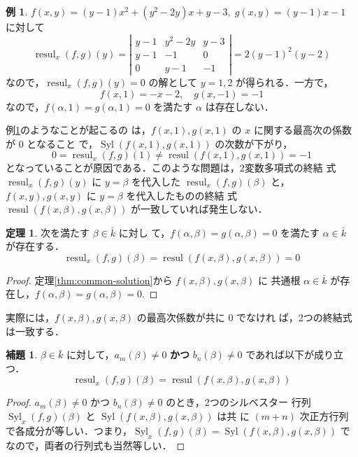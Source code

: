 \documentclass[12pt, uplatex, dvipdfmx]{jsarticle}
\theoremstyle{definition}
\newtheorem{theorem}{定理}
\newtheorem{lemma}{補題}
\newtheorem{example}{例}
\DeclareMathOperator{\Syl}{Syl}
\DeclareMathOperator{\resul}{resul}
\begin{document}
\begin{example}\label{exmp:degenerate}
  $f(x,y)=(y-1)x^2 + (y^2-2y)x + y-3, \; g(x,y) = (y-1)x-1$ に対して
  \[
    \resul_x(f,g)(y) = \left|
      \begin{array}{ccc}
        y-1 & y^2-2y & y-3\\
        y-1 & -1 & 0\\
        0 & y-1 & -1
      \end{array}
    \right| = 2(y-1)^2(y-2)
  \]
  なので，$\resul_x(f,g)(y)=0$ の解として $y=1,2$ が得られる．一方で，
  \[
    f(x,1) = -x-2, \quad g(x,-1)=-1
  \]
  なので，$f(\alpha,1)=g(\alpha,1)=0$ を満たす $\alpha$ は存在しない．
\end{example}

例\ref{exmp:degenerate}のようなことが起こるの
は，$f(x,1),g(x,1)$ の $x$ に関する最高次の係数が $0$ となること
で，$\Syl(f(x,1), g(x,1))$ の次数が下がり，
  \[
    0=\resul_x(f,g)(1) \neq \resul(f(x,1), g(x,1))=-1
  \]
  となっていることが原因である．このような問題は，2変数多項式の終結
  式 $\resul_x(f,g)(y)$ に $y=\beta$ を代入した $\resul_x(f,g)(\beta)$
  と，$f(x,y), g(x,y)$ に $y=\beta$ を代入したものの終結
  式 $\resul(f(x,\beta), g(x,\beta))$ が一致していれば発生しない．

  \begin{theorem}\label{thm:2resul}
    次を満たす $\beta \in \bar{k}$ に対し
    て，$f(\alpha,\beta)=g(\alpha,\beta)=0$ を満たす $\alpha \in
    \bar{k}$ が存在する．
    \[
      \resul_x(f,g)(\beta) = \resul(f(x,\beta), g(x,\beta)) =0
    \]
  \end{theorem}

  \begin{proof}
    定理\ref{thm:common-solution}から $f(x,\beta), g(x,\beta)$ に
    共通根 $\alpha \in \bar{k}$ が存在し，$f(\alpha,\beta)=g(\alpha,\beta)=0$. 
  \end{proof}

  実際には，$f(x,\beta), g(x,\beta)$ の最高次係数が共に $0$ でなけれ
  ば，2つの終結式は一致する．
  
\begin{lemma}\label{lem:equal-resul}
  $\beta \in \bar{k}$ に対して，$a_m(\beta) \neq 0$ \textbf{かつ} $b_n(\beta) \neq 0$ であれば以下が成り立つ．
  \[
    \resul_x(f,g)(\beta) = \resul(f(x,\beta), g(x,\beta))
  \]
\end{lemma}

\begin{proof}
  $a_m(\beta) \neq 0$ かつ $b_n(\beta)\neq 0$ のとき，2つのシルベスター
  行列 $\Syl_x(f,g)(\beta)$ と $\Syl(f(x,\beta), g(x,\beta))$ は共
  に $(m+n)$
  次正方行列で各成分が等しい．つまり，$\Syl_x(f,g)(\beta) =
  \Syl(f(x,\beta), g(x,\beta))$ でなので，両者の行列式も当然等しい．
\end{proof}
\end{document}
